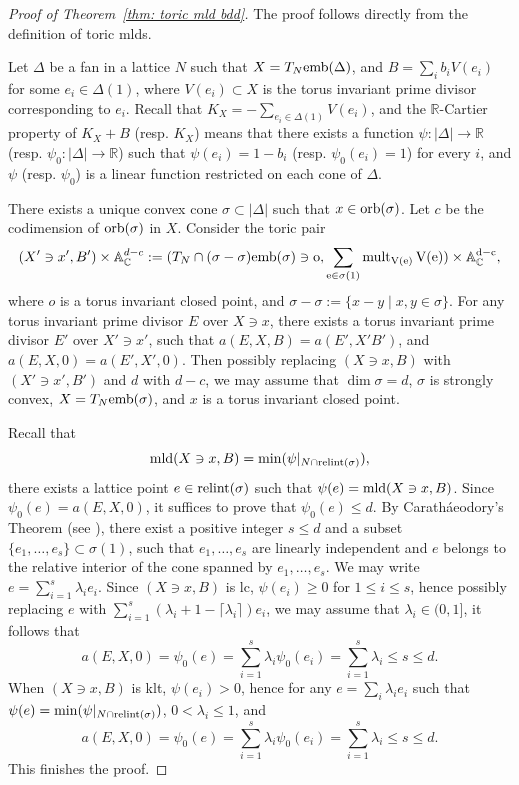 \documentclass[11pt]{amsart}
\numberwithin{equation}{section}
\newcommand{\Cc}{\mathbb{C}}
\newcommand{\Rr}{\mathbb{R}}
\newcommand{\mld}{{\rm{mld}}}
\newcommand{\mult}{\operatorname{mult}}
\theoremstyle{definition}
\theoremstyle{definition}
\begin{document}
\begin{proof}[Proof of Theorem~\ref{thm: toric mld bdd}]
The proof follows directly from the definition of toric mlds. 


Let $\Delta$ be a fan in a lattice $N$ such that $X=T_N\rm{emb}(\Delta)$, and $B=\sum_{i} b_i V(e_i)$ for some $e_i\in\Delta(1)$, where $V(e_i)\subset X$ is the torus invariant prime divisor corresponding to $e_i$. Recall that $K_X=-\sum_{e_i\in \Delta(1)} V(e_i)$, and the
$\Rr$-Cartier property of $K_X+B$ (resp. $K_X$) means that there exists a function $\psi: |\Delta|\to \Rr$ (resp. $\psi_0: |\Delta|\to \Rr$) such that
$\psi(e_i)=1-b_i$ (resp. $\psi_0(e_i)=1$) for every $i$, and $\psi$ (resp. $\psi_0$) is a linear function restricted on each cone of $\Delta$.


There exists a unique convex cone $\sigma\subset |\Delta|$ such that $x\in \rm{orb}(\sigma)$. Let $c$ be the
codimension of $\rm{orb}(\sigma)$ in $X$. Consider the toric pair $$(X'\ni x', B')\times \mathbb{A}_{\Cc}^{d-c}:=(T_{N}\cap(\sigma-\sigma)\rm{emb}(\sigma)\ni o,\sum_{e\in \sigma(1)}\mult_{V(e)} V(e))\times \mathbb{A}_{\Cc}^{d-c},$$ where $o$ is a torus invariant closed point, and $\sigma-\sigma:=\{x-y\mid x,y\in \sigma\}$. For any torus invariant prime divisor $E$ over $X\ni x$, there exists a torus invariant prime divisor $E'$ over $X'\ni x'$, such that $a(E,X,B)=a(E',X'B')$, and $a(E,X,0)=a(E',X',0)$. Then possibly replacing $(X\ni x, B)$ with $(X'\ni x',B')$ and $d$ with $d-c$, we may assume that $\dim \sigma=d$, $\sigma$ is strongly convex, $X=T_N\rm{emb}(\sigma)$, and $x$ is a torus invariant closed point.



Recall that $$\mld(X\ni x, B)=\min(\psi|_{N\cap\rm{relint}(\sigma)}),$$ there exists a lattice point $e\in\rm{relint}(\sigma)$ such that $\psi(e)=\mld(X\ni x, B)$. Since $\psi_0(e)=a(E,X,0)$, it suffices to prove that $\psi_0(e)\leq d$. By Carath\'a{e}odory’s Theorem
(see \cite[Theorem~A.15]{Oda88}), there exist a positive integer $s\leq d$ and a subset $\{e_1,\dots, e_s\} \subset \sigma(1)$, such
that $e_1,\dots,e_s$ are linearly independent and $e$ belongs to the relative interior of the cone
spanned by $e_1,\dots,e_s$. We may write $e=\sum_{i=1}^s \lambda_ie_i$. Since $(X\ni x, B)$ is lc, $\psi(e_i)\geq 0$ for $1\leq i\leq s$, hence possibly replacing $e$ with $\sum_{i=1}^s (\lambda_i+1-\lceil \lambda_i\rceil)e_i$, we may assume that $\lambda_i\in (0,1]$, it follows that $$a(E,X,0)=\psi_0(e)=\sum_{i=1}^s \lambda_i\psi_0(e_i)=\sum_{i=1}^s \lambda_i\leq s\leq d.$$ When $(X\ni x, B)$ is klt, $\psi(e_i)>0$, hence for any $e=\sum_i \lambda_ie_i$ such that $\psi(e)=\min(\psi|_{N\cap\rm{relint}(\sigma)})$, $0<\lambda_i\leq 1$, and $$a(E,X,0)=\psi_0(e)=\sum_{i=1}^s \lambda_i\psi_0(e_i)=\sum_{i=1}^s \lambda_i\leq s\leq d.$$ This finishes the proof.
\end{proof}
\end{document}
